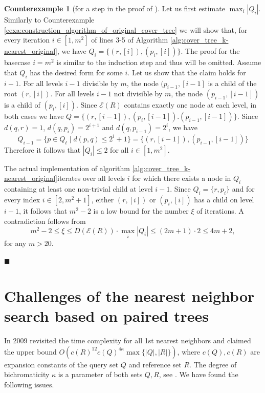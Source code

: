 \documentclass{vgtc}                          %
\numberwithin{algocf}{section}
\theoremstyle{definition}
\theoremstyle{definition}
\theoremstyle{definition}
\newtheorem{cexa}[algocf]{Counterexample}
\theoremstyle{plain}
\newcommand{\T}{\mathcal{E}}
\newcommand{\bs}{\hfill $\blacksquare$}
\begin{document}
\begin{cexa}[for a step in the proof of {\cite[Theorem~5]{beygelzimer2006cover}}]
	\medskip
	\noindent
	Let us first estimate $\max_i |Q_i|$.  
	Similarly to Counterexample \ref{cexa:construction_algorithm_of_original_cover_tree} we will show that, for every iteration $i \in [1, m^2]$ of lines 3-5 of Algorithm \ref{alg:cover_tree_k-nearest_original}, we have 
	$Q_i = \{(r,[i]),(p_i,[i])\}$. 
	The proof for the basecase $i = m^2$ is similar to the induction step and thus will be omitted. 
	Assume that $Q_{i}$ has the desired form for some $i$.
	Let us show that the claim holds for $i-1$. 
	For all levels $i-1$ divisible by $m$, the node $(p_{i-1}, [i-1]$ is a child of the root $(r,[i])$. 
	For all levels $i-1$ not divisible by $m$, the node $(p_{i-1}, [i-1])$ is a child of $(p_{i}, [i])$. 
	Since $\T(R)$ contains exactly one node at each level, in both cases
	we have $Q = \{(r,[i-1]), (p_{i},[i-1]). (p_{i-1},[i-1])\}$. 
	Since $d(q,r) = 1$, $d(q,p_{i}) = 2^{i+1}$ and $d(q,p_{i-1}) = 2^{i}$, we have 
	$$Q_{i-1} = \{p \in Q_t \mid d(p,q) \leq 2^i + 1\} = \{(r,[i-1]),(p_{i-1}, [i-1])\}$$
	Therefore it follows that $|Q_i| \leq 2$ for all $i \in [1, m^2]$.
	
	\medskip
	\noindent
	The actual implementation of algorithm \ref{alg:cover_tree_k-nearest_original}iterates over all levels $i$ for which there exists a node in $Q_i$ containing at least one non-trivial child at level $i-1$. 
	Since $Q_i = \{r,p_i\}$ and for every index $i \in [2,m^2+1]$, either $(r,[i])$ or $(p_{i},[i])$ has a child on level $i-1$, it follows that  $m^2-2$ is a low bound for the number $\xi$  of iterations. 
	A contradiction follows from  
	$$m^2 - 2 \leq \xi \leq  D(\T(R)) \cdot  \max_i|Q_i| \leq (2m+1) \cdot 2 \leq 4m+2,$$
	for any $m > 20$. 
	
	\bs
\end{cexa}

\section{Challenges of the nearest neighbor search based on paired trees}
\label{sec:challenges_paired_tree}

In 2009 \cite[Theorem~3.1]{ram2009linear} revisited the time complexity for all 1st nearest neighbors and claimed the upper bound $O(c(R)^{12}c(Q)^{4\kappa}\max\{|Q|,|R|\})$, where $c(Q),c(R)$ are expansion constants of the query set $Q$ and reference set $R$.
The degree of bichromaticity $\kappa$ is a parameter of both sets $Q,R$, see \cite[Definition~3.1]{ram2009linear}.
We have found the following issues.
\end{document}
